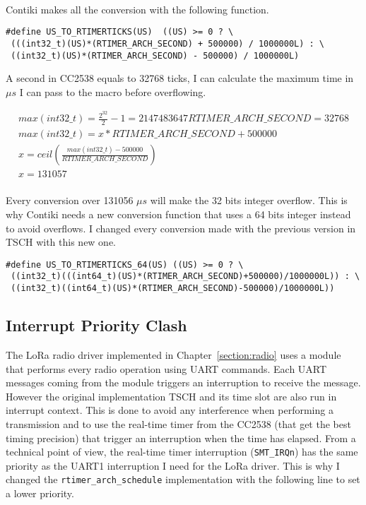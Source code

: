 \paragraph{}

Contiki makes all the conversion with the following function.

\begin{lstlisting}
#define US_TO_RTIMERTICKS(US)  ((US) >= 0 ? \
 (((int32_t)(US)*(RTIMER_ARCH_SECOND) + 500000) / 1000000L) : \
 ((int32_t)(US)*(RTIMER_ARCH_SECOND) - 500000) / 1000000L)
\end{lstlisting}

A second in CC2538 equals to 32768 ticks, I can calculate the maximum time in $\mu s$
I can pass to the macro before overflowing.

\begin{equation}
  \label{eq:maxus}
  \begin{multlined}
  max(int32\_t) = \frac{2^{32}}{2} - 1 = 2147483647
  RTIMER\_ARCH\_SECOND = 32768 \\
  max(int32\_t) = x * RTIMER\_ARCH\_SECOND + 500000 \\
  x = ceil(\frac{max(int32\_t) - 500000}{RTIMER\_ARCH\_SECOND}) \\
  x = 131057 \\
  \end{multlined}
\end{equation}

Every conversion over 131056 $\mu s$ will make the 32 bits integer overflow.
This is why Contiki needs a new conversion function that uses a 64 bits integer
instead to avoid overflows.
I changed every conversion made with the previous version in TSCH
with this new one.

\begin{lstlisting}
#define US_TO_RTIMERTICKS_64(US) ((US) >= 0 ? \
 ((int32_t)(((int64_t)(US)*(RTIMER_ARCH_SECOND)+500000)/1000000L)) : \
 ((int32_t)((int64_t)(US)*(RTIMER_ARCH_SECOND)-500000)/1000000L))
\end{lstlisting}

\subsection{Interrupt Priority Clash}

The LoRa radio driver implemented in Chapter~\ref{section:radio}
uses a module that performs every radio operation using UART commands.
Each UART messages coming from the module triggers an interruption to receive the
message.
However the original implementation TSCH and its time slot are also run in
interrupt context.
This is done to avoid any interference when performing a transmission and to
use the real-time timer from the CC2538 (that get the best timing
precision) that trigger an interruption when the time has elapsed.
From a technical point of view,
the real-time timer interruption (\lstinline{SMT_IRQn}) has the same
priority as the UART1 interruption I need for the LoRa driver.
This is why I changed the \lstinline{rtimer_arch_schedule} implementation with
the following line to set a lower priority.

